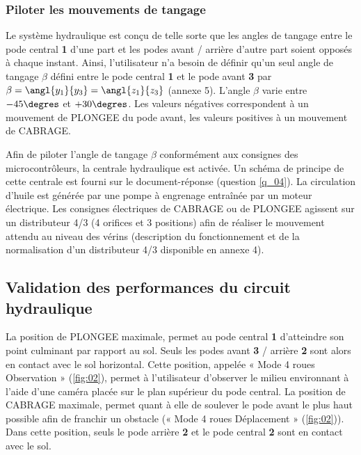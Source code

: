 \subsubsection{Piloter les mouvements de tangage}
\ifprof
\else

Le système hydraulique est conçu de telle sorte que les angles de tangage entre le pode central \textbf{1} d’une part et les
podes avant / arrière d’autre part soient opposés à chaque instant. Ainsi, l’utilisateur n’a besoin de définir qu’un seul
angle de tangage $\beta$ défini entre le pode central \textbf{1} et le pode avant \textbf{3} par $\beta=\angl{y_1}{y_3}=\angl{z_1}{z_3}$ (annexe 5). L’angle
$\beta$
varie entre $- 45\degres$ et $+30\degres$. Les valeurs négatives correspondent à un mouvement de PLONGEE du pode avant, les
valeurs positives à un mouvement de CABRAGE.

Afin de piloter l’angle de tangage $\beta$ conformément aux consignes des microcontrôleurs, la centrale hydraulique est activée. Un schéma de principe de cette centrale est fourni sur le document-réponse (question \ref{q_04}). La circulation d’huile est générée par une pompe à engrenage entraînée par un moteur électrique. Les consignes électriques de CABRAGE ou de PLONGEE agissent sur un distributeur 4/3 (4 orifices et 3 positions) afin de réaliser le mouvement attendu au niveau des vérins (description du fonctionnement et de la normalisation d’un distributeur 4/3 disponible en annexe 4).
\fi

\ifprof
\begin{corrige}
\end{corrige}
\else
\fi



\subsection{Validation des performances du circuit hydraulique}
\ifprof
\else

La position de PLONGEE maximale, permet au pode central \textbf{1} d’atteindre son point culminant par rapport au sol. Seuls les podes avant \textbf{3} / arrière \textbf{2} sont alors en contact avec le sol horizontal. Cette position, appelée « Mode 4 roues Observation » (\autoref{fig:02}), permet à l’utilisateur d’observer le milieu environnant à l’aide d’une caméra placée sur le plan supérieur du pode central. La position de CABRAGE maximale, permet quant à elle de soulever le pode avant le plus haut possible afin de franchir un obstacle (« Mode 4 roues Déplacement » (\autoref{fig:02})). Dans cette position, seuls le pode arrière \textbf{2} et le pode central \textbf{2} sont en contact avec le sol.
\fi

